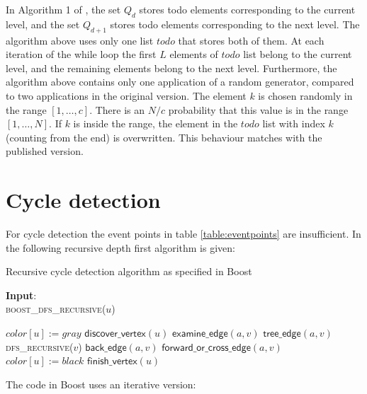 \documentclass{article}
\begin{document}
In Algorithm 1 of \cite{DBLP:journals/jlp/EngelsGWW09}, the set $Q_d$ stores todo elements corresponding to the current level, and the set $Q_{d+1}$ stores todo elements corresponding to the next level. The algorithm above uses only one list $todo$ that stores both of them. At each iteration of the while loop the first $L$ elements of $todo$ list belong to the current level, and the remaining elements belong to the next level. Furthermore, the algorithm above contains only one application of a random generator, compared to two applications in the original version. The element $k$ is chosen randomly in the range $[1, \ldots, c]$. There is an $N/c$ probability that this value is in the range $[1, \ldots, N]$. If $k$ is inside the range, the element in the $todo$ list with index $k$ (counting from the end) is overwritten. This behaviour matches with the published version.

\newpage
\section{Cycle detection}
For cycle detection the event points in table \ref{table:eventpoints} are insufficient. In \cite{2002:BGL:504206} the following recursive depth first algorithm is given:

\begin{algorithm}
\small
\caption{Recursive cycle detection algorithm as specified in Boost}
\vspace*{1ex}
{\textbf{Input}:} \\
\textsc{boost\_dfs\_recursive}($u$)
\begin{algorithmic}[1]
\State $color[u] := gray$
\State $\textsf{discover\_vertex}(u)$
  \State $\textsf{examine\_edge}(a, v)$
    \State $\textsf{tree\_edge}(a, v)$
    \State \textsc{dfs\_recursive}($v$)
    \State $\textsf{back\_edge}(a, v)$
  \Else
    \State $\textsf{forward\_or\_cross\_edge}(a, v)$
  \EndIf
  \State $color[u] := black$
  \State $\textsf{finish\_vertex}(u)$
\EndFor
\end{algorithmic}
\end{algorithm}

The code in Boost uses an iterative version:
\end{document}
